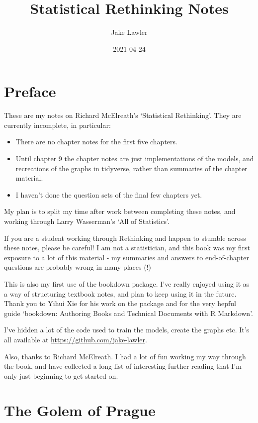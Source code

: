 \documentclass[
]{book}
\title{Statistical Rethinking Notes}
\author{Jake Lawler}
\date{2021-04-24}
\providecommand{\tightlist}{%
  \setlength{\itemsep}{0pt}\setlength{\parskip}{0pt}}
\begin{document}
\maketitle

{
\setcounter{tocdepth}{1}
\tableofcontents
}
\hypertarget{preface}{%
\chapter*{Preface}\label{preface}}

These are my notes on Richard McElreath's `Statistical Rethinking'. They are currently incomplete, in particular:

\begin{itemize}
\tightlist
\item
  There are no chapter notes for the first five chapters.
\item
  Until chapter 9 the chapter notes are just implementations of the models, and recreations of the graphs in tidyverse, rather than summaries of the chapter material.
\item
  I haven't done the question sets of the final few chapters yet.
\end{itemize}

My plan is to split my time after work between completing these notes, and working through Larry Wasserman's `All of Statistics'.

If you are a student working through Rethinking and happen to stumble across these notes, please be careful! I am not a statistician, and this book was my first exposure to a lot of this material - my summaries and answers to end-of-chapter questions are probably wrong in many places (!)

This is also my first use of the bookdown package. I've really enjoyed using it as a way of structuring textbook notes, and plan to keep using it in the future. Thank you to Yihui Xie for his work on the package and for the very hepful guide `bookdown: Authoring Books and Technical Documents with R Markdown'.

I've hidden a lot of the code used to train the models, create the graphs etc. It's all available at \url{https://github.com/jake-lawler}.

Also, thanks to Richard McElreath. I had a lot of fun working my way through the book, and have collected a long list of interesting further reading that I'm only just beginning to get started on.

\hypertarget{prague}{%
\chapter{The Golem of Prague}\label{prague}}
\end{document}
